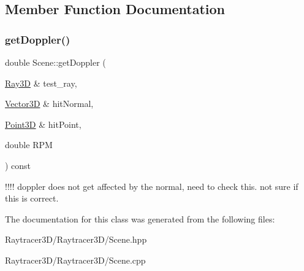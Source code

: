 \subsection{Member Function Documentation}
\hypertarget{class_scene_a969abe0e6022d73ff082d380c59d83f5}{}\label{class_scene_a969abe0e6022d73ff082d380c59d83f5} 
\subsubsection{\texorpdfstring{get\+Doppler()}{getDoppler()}}
{\footnotesize\ttfamily double Scene\+::get\+Doppler (\begin{DoxyParamCaption}\item[{\hyperlink{class_ray3_d}{Ray3D} \&}]{test\+\_\+ray,  }\item[{\hyperlink{class_vector3_d}{Vector3D} \&}]{hit\+Normal,  }\item[{\hyperlink{class_point3_d}{Point3D} \&}]{hit\+Point,  }\item[{double}]{R\+PM }\end{DoxyParamCaption}) const\hspace{0.3cm}{\ttfamily [inline]}}

!!!! doppler does not get affected by the normal, need to check this. not sure if this is correct. 

The documentation for this class was generated from the following files\+:\begin{DoxyCompactItemize}
\item 
Raytracer3\+D/\+Raytracer3\+D/Scene.\+hpp\item 
Raytracer3\+D/\+Raytracer3\+D/Scene.\+cpp\end{DoxyCompactItemize}
